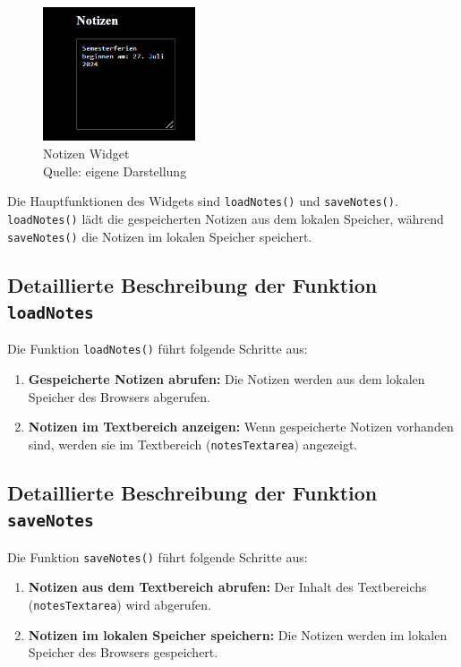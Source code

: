 \begin{figure}[h]
    \centering
    \includegraphics[width=0.4\textwidth]{pictures/notes_widget.png}
  \captionsetup{justification=centering, labelformat=simple, singlelinecheck=false}
    \caption[Notizen Widget]{Notizen Widget\\ Quelle: eigene Darstellung}
\end{figure}

\noindent
Die Hauptfunktionen des Widgets sind \texttt{loadNotes()} und \texttt{saveNotes()}. \texttt{loadNotes()} lädt die gespeicherten Notizen aus dem lokalen Speicher, während \texttt{saveNotes()} die Notizen im lokalen Speicher speichert.

\subsection*{Detaillierte Beschreibung der Funktion \texttt{loadNotes}}
Die Funktion \texttt{loadNotes()} führt folgende Schritte aus:

\begin{enumerate}
    \item \textbf{Gespeicherte Notizen abrufen:}
    Die Notizen werden aus dem lokalen Speicher des Browsers abgerufen.
    
    \item \textbf{Notizen im Textbereich anzeigen:}
    Wenn gespeicherte Notizen vorhanden sind, werden sie im Textbereich (\texttt{notesTextarea}) angezeigt.
\end{enumerate}

\subsection*{Detaillierte Beschreibung der Funktion \texttt{saveNotes}}
Die Funktion \texttt{saveNotes()} führt folgende Schritte aus:

\begin{enumerate}
    \item \textbf{Notizen aus dem Textbereich abrufen:}
    Der Inhalt des Textbereichs (\texttt{notesTextarea}) wird abgerufen.
    
    \item \textbf{Notizen im lokalen Speicher speichern:}
    Die Notizen werden im lokalen Speicher des Browsers gespeichert.
\end{enumerate}

